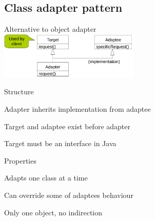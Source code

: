 \subsection{Class adapter pattern}
\enumstart
	\item Alternative to object adapter
	\\ \includegraphics[width=0.5\textwidth]{img/class_adapter_pattern.png}
	\item Structure
	\enumstart
		\item Adapter inherits implementation from adaptee
		\item Target and adaptee exist before adapter
		\item Target must be an interface in Java
	\enumend
	\item Properties
	\enumstart
		\item Adapts one class at a time
		\item Can override some of adaptees behaviour
		\item Only one object, no indirection
	\enumend
\enumend

